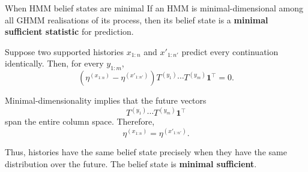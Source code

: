 \documentclass[aspectratio=169,12pt,t]{beamer}
\begin{document}
\begin{frame}{When HMM belief states are minimal}
  \setlength{\parskip}{0pt}
  \setlength{\abovedisplayskip}{3pt}
  \setlength{\belowdisplayskip}{3pt}
  If an HMM is minimal-dimensional among all GHMM realisations of its process,
  then its belief state is a \textbf{minimal sufficient statistic} for
  prediction.

  \vspace{2mm}
  Suppose two supported histories $x_{1:n}$ and $x'_{1:n'}$ predict every
  continuation identically.
  Then, for every $y_{1:m}$,
  \[
    \left(
      \eta^{(x_{1:n})}-\eta^{(x'_{1:n'})}
    \right)
    T^{(y_1)}\cdots T^{(y_m)}\mathbf1^\top
    =0.
  \]

  \vspace{1mm}
  Minimal-dimensionality implies that the future vectors
  \[
    T^{(y_1)}\cdots T^{(y_m)}\mathbf1^\top
  \]
  span the entire column space. Therefore,
  \[
    \eta^{(x_{1:n})}=\eta^{(x'_{1:n'})}.
  \]

  \vfill
  Thus, histories have the same belief state precisely when they have the
  same distribution over the future. The belief state is
  \textbf{minimal sufficient}.

  \vspace{-1mm}
  \vfill

\end{frame}
\end{document}

